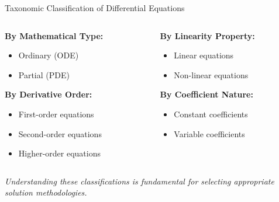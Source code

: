 \documentclass[10pt,aspectratio=169]{beamer}
\newcommand{\concept}[1]{\textbf{#1}}
\newcommand{\emphasis}[1]{\textit{#1}}
\begin{document}
\begin{frame}{Taxonomic Classification of Differential Equations}
    \begin{columns}
        \begin{column}{0.5\textwidth}
            \concept{By Mathematical Type:}
            \begin{itemize}
                \item Ordinary (ODE)
                \item Partial (PDE)
            \end{itemize}
            
            \vspace{0.3cm}
            
            \concept{By Derivative Order:}
            \begin{itemize}
                \item First-order equations
                \item Second-order equations
                \item Higher-order equations
            \end{itemize}
        \end{column}
        \begin{column}{0.5\textwidth}
            \concept{By Linearity Property:}
            \begin{itemize}
                \item Linear equations
                \item Non-linear equations
            \end{itemize}
            
            \vspace{0.3cm}
            
            \concept{By Coefficient Nature:}
            \begin{itemize}
                \item Constant coefficients
                \item Variable coefficients
            \end{itemize}
        \end{column}
    \end{columns}
    
    \vspace{0.3cm}
    
    \emphasis{Understanding these classifications is fundamental for selecting appropriate solution methodologies.}
\end{frame}
\end{document}
